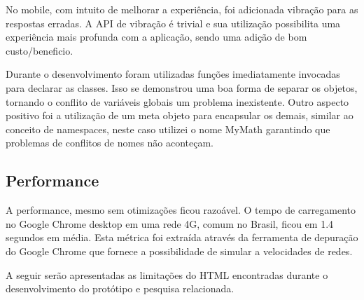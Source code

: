 No mobile, com intuito de melhorar a experiência, foi adicionada
vibração para as respostas erradas. A API de vibração é trivial e sua 
utilização possibilita uma experiência mais profunda com a aplicação, sendo 
uma adição de bom custo/beneficio.

Durante o desenvolvimento foram utilizadas funções imediatamente
invocadas para declarar as classes. Isso se demonstrou uma boa forma
de separar os objetos, tornando o conflito de variáveis globais um
problema inexistente. Outro aspecto positivo foi a utilização de
um meta objeto para encapsular os demais, similar ao conceito de
namespaces, neste caso utilizei o nome MyMath garantindo que problemas
de conflitos de nomes não aconteçam.

\subsection{Performance}

A performance, mesmo sem otimizações ficou razoável. O tempo de
carregamento no Google Chrome desktop em uma rede 4G, comum no Brasil,
ficou em 1.4 segundos em média. Esta métrica foi extraída através da
ferramenta de depuração do Google Chrome que fornece a possibilidade
de simular a velocidades de redes.


A seguir serão apresentadas as limitações do HTML encontradas durante o desenvolvimento do 
protótipo e pesquisa relacionada.

